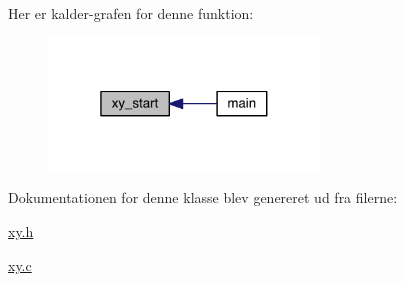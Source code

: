 Her er kalder-\/grafen for denne funktion\+:
\nopagebreak
\begin{figure}[H]
\begin{center}
\leavevmode
\includegraphics[width=205pt]{db/d87/class_x_y_a47c6cc7fae92395e4d1231428c7070d4_icgraph}
\end{center}
\end{figure}




Dokumentationen for denne klasse blev genereret ud fra filerne\+:\begin{DoxyCompactItemize}
\item 
\hyperlink{xy_8h}{xy.\+h}\item 
\hyperlink{xy_8c}{xy.\+c}\end{DoxyCompactItemize}
